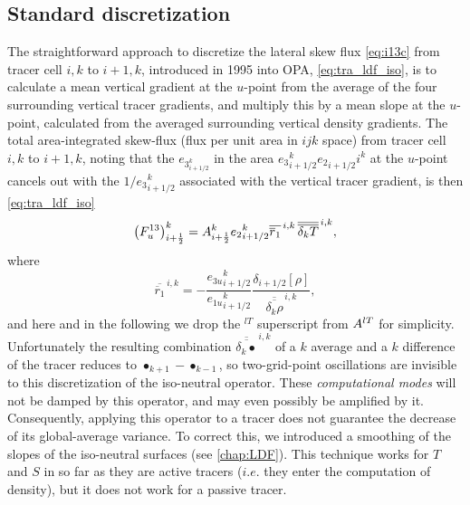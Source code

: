 \documentclass[../tex_main/NEMO_manual]{subfiles}
\begin{document}
\subsection{Standard discretization}
The straightforward approach to discretize the lateral skew flux
\autoref{eq:i13c} from tracer cell $i,k$ to $i+1,k$, introduced in 1995 into OPA,
\autoref{eq:tra_ldf_iso}, is to calculate a mean vertical gradient at the $u$-point from
the average of the four surrounding vertical tracer gradients, and multiply this by a mean slope at the $u$-point,
calculated from the averaged surrounding vertical density gradients.
The total area-integrated skew-flux (flux per unit area in $ijk$ space) from tracer cell $i,k$ to $i+1,k$,
noting that the $e_{{3}_{i+1/2}^k}$ in the area $e{_{3}}_{i+1/2}^k{e_{2}}_{i+1/2}i^k$ at the $u$-point cancels out with
the $1/{e_{3}}_{i+1/2}^k$ associated with the vertical tracer gradient, is then \autoref{eq:tra_ldf_iso}
\[
  \left(F_u^{13} \right)_{i+\scriptstyle\frac{1}{2}}^k = {A}_{i+\scriptstyle\frac{1}{2}}^k
  {e_{2}}_{i+1/2}^k \overline{\overline
    r_1} ^{\,i,k}\,\overline{\overline{\delta_k T}}^{\,i,k},
\]
where
\[
  \overline{\overline
   r_1} ^{\,i,k} = -\frac{{e_{3u}}_{i+1/2}^k}{{e_{1u}}_{i+1/2}^k}
  \frac{\delta_{i+1/2} [\rho]}{\overline{\overline{\delta_k \rho}}^{\,i,k}},
\]
and here and in the following we drop the $^{lT}$ superscript from ${A^{lT}}$ for simplicity.
Unfortunately the resulting combination $\overline{\overline{\delta_k\bullet}}^{\,i,k}$ of a $k$ average and
a $k$ difference of the tracer reduces to $\bullet_{k+1}-\bullet_{k-1}$,
so two-grid-point oscillations are invisible to this discretization of the iso-neutral operator.
These \emph{computational modes} will not be damped by this operator, and may even possibly be amplified by it.
Consequently, applying this operator to a tracer does not guarantee the decrease of its global-average variance.
To correct this, we introduced a smoothing of the slopes of the iso-neutral surfaces (see \autoref{chap:LDF}).
This technique works for $T$ and $S$ in so far as they are active tracers
($i.e.$ they enter the computation of density), but it does not work for a passive tracer.
\end{document}
